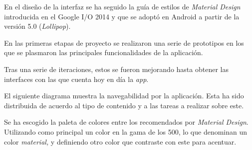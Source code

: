 En el diseño de la interfaz se ha seguido la guía de estilos de
\emph{Material Design} \citep{design:material} introducida en el Google
I/O 2014 y que se adoptó en Android a partir de la versión 5.0
(\emph{Lollipop}).

En las primeras etapas de proyecto se realizaron una serie de prototipos
en los que se plasmaron las principales funcionalidades de la
aplicación.


Tras una serie de iteraciones, estos se fueron mejorando hasta obtener
las interfaces con las que cuenta hoy en día la \emph{app}.


El siguiente diagrama muestra la navegabilidad por la aplicación. Esta
ha sido distribuida de acuerdo al tipo de contenido y a las tareas a
realizar sobre este.


Se ha escogido la paleta de colores entre los recomendados por
\emph{Material Design}. Utilizando como principal un color en la gama de
los 500, lo que denominan un color \emph{material,} y definiendo otro
color que contraste con este para acentuar.

